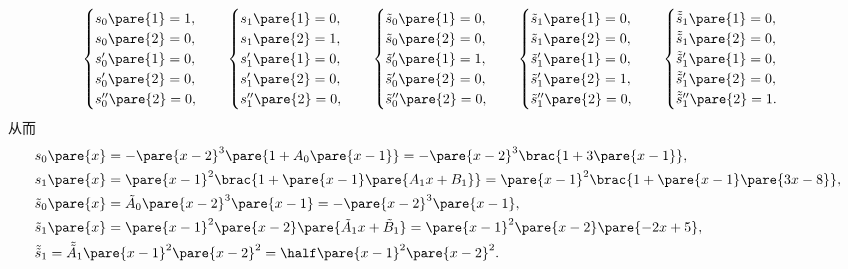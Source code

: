 \documentclass[hidelinks]{ctexart}
\begin{document}
\[ \begin{cases}
    s_0\pare{1} = 1, \\
    s_0\pare{2} = 0, \\
    s'_0\pare{1} = 0, \\
    s'_0\pare{2} = 0, \\
    s''_0\pare{2} = 0,
\end{cases}\quad \begin{cases}
    s_1\pare{1} = 0, \\
    s_1\pare{2} = 1, \\
    s'_1\pare{1} = 0, \\
    s'_1\pare{2} = 0, \\
    s''_1\pare{2} = 0,
\end{cases}\quad \begin{cases}
    \tilde{s}_0\pare{1} = 0, \\
    \tilde{s}_0\pare{2} = 0, \\
    \tilde{s}'_0\pare{1} = 1, \\
    \tilde{s}'_0\pare{2} = 0, \\
    \tilde{s}''_0\pare{2} = 0,
\end{cases}\quad \begin{cases}
    \tilde{s}_1\pare{1} = 0, \\
    \tilde{s}_1\pare{2} = 0, \\
    \tilde{s}'_1\pare{1} = 0, \\
    \tilde{s}'_1\pare{2} = 1, \\
    \tilde{s}''_1\pare{2} = 0,
\end{cases}\quad \begin{cases}
    \tilde{\tilde{s}}_1\pare{1} = 0, \\
    \tilde{\tilde{s}}_1\pare{2} = 0, \\
    \tilde{\tilde{s}}'_1\pare{1} = 0, \\
    \tilde{\tilde{s}}'_1\pare{2} = 0, \\
    \tilde{\tilde{s}}''_1\pare{2} = 1.
\end{cases} \]
从而
\begin{align*}
    & s_0\pare{x} = -\pare{x-2}^3\pare{1+A_0\pare{x-1}} = -\pare{x-2}^3\brac{1+3\pare{x-1}}, \\
    & s_1\pare{x} = \pare{x-1}^2\brac{1+\pare{x-1}\pare{A_1x+B_1}} = \pare{x-1}^2\brac{1+\pare{x-1}\pare{3x - 8}}, \\
    & \tilde{s}_0\pare{x} = \tilde{A}_0\pare{x-2}^3\pare{x-1} = -\pare{x-2}^3\pare{x-1}, \\
    & \tilde{s}_1\pare{x} = \pare{x-1}^2\pare{x-2}\pare{\tilde{A}_1 x + \tilde{B}_1} = \pare{x-1}^2\pare{x-2}\pare{-2 x + 5}, \\
    & \tilde{\tilde{s}}_1 = \tilde{\tilde{A}}_1 \pare{x-1}^2\pare{x-2}^2 = \half \pare{x-1}^2\pare{x-2}^2.
\end{align*}
\end{document}

